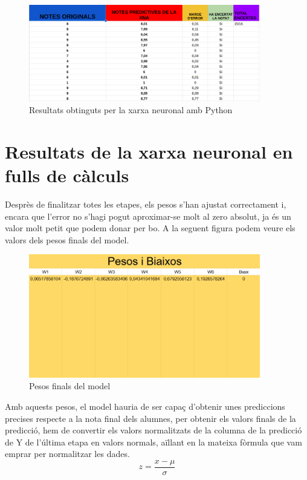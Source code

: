 \begin{figure}[h!]
 \centering
 \includegraphics[width=0.9\textwidth]{./figures/Resultats.png}
 \caption{Resultats obtinguts per la xarxa neuronal amb Python}
 \label{f:resultats}
\end{figure}


\section{Resultats de la xarxa neuronal en fulls de càlculs}\label{sec: full de càlcul}
Desprès de finalitzar totes les etapes, els pesos s'han ajustat correctament i, encara que l'error no s'hagi pogut aproximar-se molt al zero absolut, ja és un valor molt petit que podem donar per bo. A la seguent figura podem veure els valors dels pesos finals del model.

\begin{figure}[H]
    \centering
    \includegraphics[width=0.9\textwidth]{./figures/Pesos_finals.png}
    \caption{Pesos finals del model}
\end{figure}

Amb aquests pesos, el model hauria de ser capaç d'obtenir unes prediccions precises respecte a la nota final dels alumnes, per obtenir els valors finals de la predicció, hem de convertir els valors normalitzats de la columna de la predicció de Y de l'última etapa en valors normals, aïllant en la mateixa fòrmula que vam emprar per normalitzar les dades.
$$z = \frac{x - \mu}{\sigma}$$

